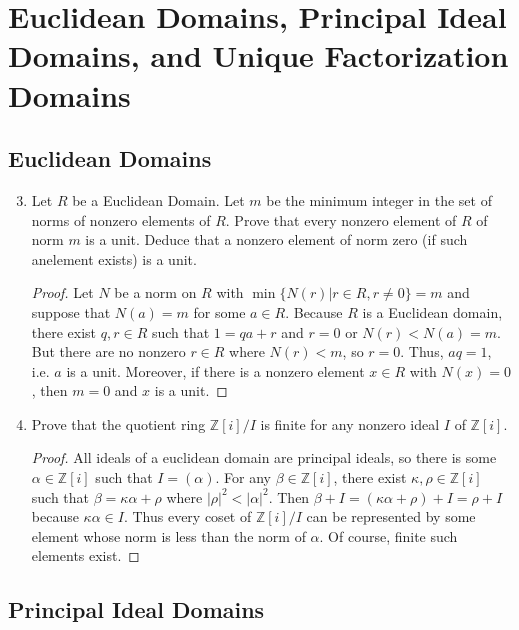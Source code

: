 \documentclass{report}
\newcommand{\Z}{\mathbb{Z}}
\begin{document}
\chapter{Euclidean Domains, Principal Ideal Domains, and Unique Factorization Domains}

\section{Euclidean Domains}
\begin{enumerate}
   	\setcounter{enumi}{2}
	\item Let $R$ be a Euclidean Domain. Let $m$ be the minimum integer in the set of norms of nonzero elements of $R$.
	Prove that every nonzero element of $R$ of norm $m$ is a unit.
	Deduce that a nonzero element of norm zero (if such anelement exists) is a unit.
	\begin{proof}
		Let $N$ be a norm on $R$ with $\min\{N(r)|r\in R, r\neq 0\}=m$ and suppose that $N(a)=m$ for some $a\in R$.  
		Because $R$ is a Euclidean domain, there exist $q,r\in R$ such that $1=qa+r$ and $r=0$ or $N(r)<N(a)=m$.
		But there are no nonzero $r\in R$ where $N(r)<m$, so $r=0$. Thus, $aq=1$, i.e. $a$ is a unit.
		Moreover, if there is a nonzero element $x\in R$ with $N(x)=0$, then $m=0$ and $x$ is a unit.
	\end{proof}
	


	\setcounter{enumi}{9}
	\item Prove that the quotient ring $\Z[i]/I$ is finite for any nonzero ideal $I$ of $\Z[i]$. 
	\begin{proof}
		All ideals of a euclidean domain are principal ideals, so there is some $\alpha\in \Z[i]$ such that $I=(\alpha)$.
		For any $\beta\in\Z[i]$, there exist $\kappa,\rho\in\Z[i]$ such that $\beta = \kappa\alpha + \rho$ where $|\rho|^2<|\alpha|^2$.
		Then $\beta + I=(\kappa\alpha+\rho) + I=\rho + I$ because $\kappa\alpha\in I$.
		Thus every coset of $\Z[i]/I$ can be represented by some element whose norm is less than the norm of $\alpha$.
		Of course, finite such elements exist.
	\end{proof}
	
\end{enumerate}


\section{Principal Ideal Domains}
\end{document}
